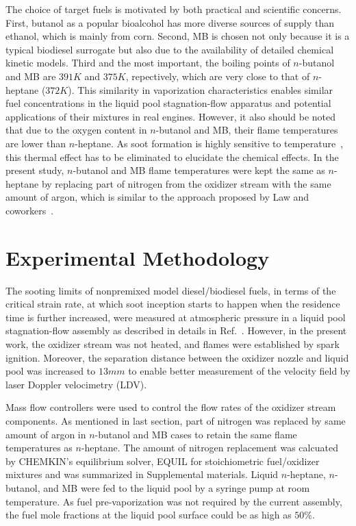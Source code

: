 \documentclass[preprint,3p,times,twocolumn]{elsarticleUS}
\begin{document}
The choice of target fuels is motivated by both practical and scientific concerns. First, butanol as a popular bioalcohol has more diverse sources of supply than ethanol, which is mainly from corn. Second, MB is chosen not only because it is a typical biodiesel surrogate but also due to the availability of detailed chemical kinetic models. Third and the most important, the boiling points of $n$-butanol and MB are $391 K $ and $375 K$, repectively, which are very close to that of $n$-heptane ($372 K $). This similarity in vaporization characteristics enables similar fuel concentrations in the liquid pool stagnation-flow apparatus and potential applications of their mixtures in real engines. However, it also should be noted that due to the oxygen content in $n$-butanol and MB, their flame temperatures are lower than $n$-heptane. As soot formation is highly sensitive to temperature~\cite{wang11}, this thermal effect has to be eliminated to elucidate the chemical effects. In the present study, $n$-butanol and MB flame temperatures were kept the same as $n$-heptane by replacing part of nitrogen from the oxidizer stream with the same amount of argon, which is similar to the approach proposed by Law and coworkers~\cite{du89,du91,axelbaum91}.


\section{Experimental Methodology}

The sooting limits of nonpremixed model diesel/biodiesel fuels, in terms of the critical strain rate, at which soot inception starts to happen when the residence time is further increased, were measured at atmospheric pressure in a liquid pool stagnation-flow assembly as described in details in Ref.~\cite{liu10}. However, in the present work, the oxidizer stream was not heated, and flames were established by spark ignition. Moreover, the separation distance between the oxidizer nozzle and liquid pool was increased to $13 mm$ to enable better measurement of the velocity field by laser Doppler velocimetry (LDV).

Mass flow controllers were used to control the flow rates of the oxidizer stream components. As mentioned in last section, part of nitrogen was replaced by same amount of argon in $n$-butanol and MB cases to retain the same flame temperatures as $n$-heptane. The amount of nitrogen replacement was calcuated by CHEMKIN's equilibrium solver, EQUIL\cite{chemkin} for stoichiometric fuel/oxidizer mixtures and  was summarized in Supplemental materials. Liquid $n$-heptane, $n$-butanol, and MB were fed to the liquid pool by a syringe pump at room temperature. As fuel pre-vaporization was not required by the current assembly, the fuel mole fractions at the liquid pool surface could be as high as $50\%$. 
\end{document}
